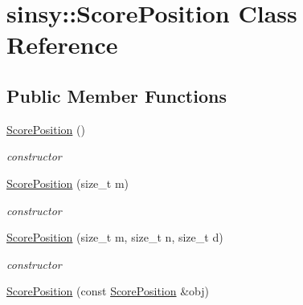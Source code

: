 \hypertarget{classsinsy_1_1ScorePosition}{\section{sinsy\-:\-:\-Score\-Position \-Class \-Reference}
\label{classsinsy_1_1ScorePosition}
}
\subsection*{\-Public \-Member \-Functions}
\begin{DoxyCompactItemize}
\item 
\hypertarget{classsinsy_1_1ScorePosition_a351cf7880a457353b82f5aca418c40ce}{\hyperlink{classsinsy_1_1ScorePosition_a351cf7880a457353b82f5aca418c40ce}{\-Score\-Position} ()}\label{classsinsy_1_1ScorePosition_a351cf7880a457353b82f5aca418c40ce}

\begin{DoxyCompactList}\small\item\em constructor \end{DoxyCompactList}\item 
\hypertarget{classsinsy_1_1ScorePosition_ae1198c95e91e4067844c57c123a0baa0}{\hyperlink{classsinsy_1_1ScorePosition_ae1198c95e91e4067844c57c123a0baa0}{\-Score\-Position} (size\-\_\-t m)}\label{classsinsy_1_1ScorePosition_ae1198c95e91e4067844c57c123a0baa0}

\begin{DoxyCompactList}\small\item\em constructor \end{DoxyCompactList}\item 
\hypertarget{classsinsy_1_1ScorePosition_ae12829aaa62b2cc608159e6e1c9fc873}{\hyperlink{classsinsy_1_1ScorePosition_ae12829aaa62b2cc608159e6e1c9fc873}{\-Score\-Position} (size\-\_\-t m, size\-\_\-t n, size\-\_\-t d)}\label{classsinsy_1_1ScorePosition_ae12829aaa62b2cc608159e6e1c9fc873}

\begin{DoxyCompactList}\small\item\em constructor \end{DoxyCompactList}\item 
\hypertarget{classsinsy_1_1ScorePosition_a802bf7f9e230ba5d5880af9d79bf4a99}{\hyperlink{classsinsy_1_1ScorePosition_a802bf7f9e230ba5d5880af9d79bf4a99}{\-Score\-Position} (const \hyperlink{classsinsy_1_1ScorePosition}{\-Score\-Position} \&obj)}\label{classsinsy_1_1ScorePosition_a802bf7f9e230ba5d5880af9d79bf4a99}


\end{DoxyCompactItemize}
